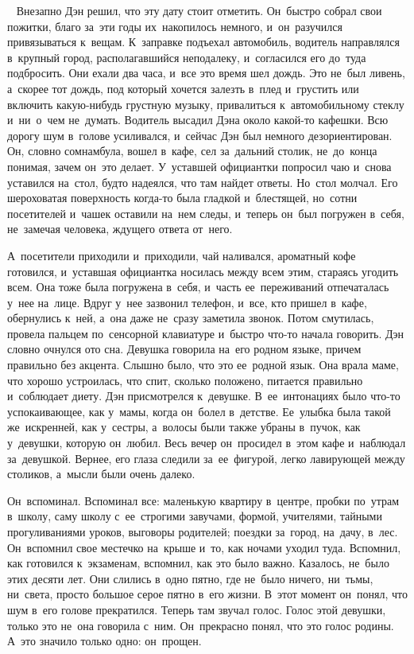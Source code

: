 ~
Внезапно Дэн решил, что эту дату стоит отметить.
Он~быстро собрал свои пожитки, благо за~эти годы их~накопилось немного, и~он~разучился привязываться к~вещам.
К~заправке подъехал автомобиль, водитель направлялся в~крупный город, располагавшийся неподалеку, и~согласился его до~туда подбросить.
Они ехали два часа, и~все это время шел дождь.
Это не~был ливень, а~скорее тот дождь, под который хочется залезть в~плед и~грустить или включить какую-нибудь грустную музыку, привалиться к~автомобильному стеклу и~ни~о~чем не~думать.
Водитель высадил Дэна около какой-то кафешки.
Всю дорогу шум в~голове усиливался, и~сейчас Дэн был немного дезориентирован.
Он, словно сомнамбула, вошел в~кафе, сел за~дальний столик, не~до~конца понимая, зачем он~это делает.
У~уставшей официантки попросил чаю и~снова уставился на~стол, будто надеялся, что там найдет ответы.
Но~стол молчал.
Его шероховатая поверхность когда-то была гладкой и~блестящей, но~сотни посетителей и~чашек оставили на~нем следы, и~теперь он~был погружен в~себя, не~замечая человека, ждущего ответа от~него.
 
А~посетители приходили и~приходили, чай наливался, ароматный кофе готовился, и~уставшая официантка носилась между всем этим, стараясь угодить всем.
Она тоже была погружена в~себя, и~часть ее~переживаний отпечаталась у~нее на~лице.
Вдруг у~нее зазвонил телефон, и~все, кто пришел в~кафе, обернулись к~ней, а~она даже не~сразу заметила звонок.
Потом смутилась, провела пальцем по~сенсорной клавиатуре и~быстро что-то начала говорить.
Дэн словно очнулся ото сна.
Девушка говорила на~его родном языке, причем правильно без акцента.
Слышно было, что это ее~родной язык.
Она врала маме, что хорошо устроилась, что спит, сколько положено, питается правильно и~соблюдает диету.
Дэн присмотрелся к~девушке.
В~ее~интонациях было что-то успокаивающее, как у~мамы, когда он~болел в~детстве.
Ее~улыбка была такой же~искренней, как у~сестры, а~волосы были также убраны в~пучок, как у~девушки, которую он~любил.
Весь вечер он~просидел в~этом кафе и~наблюдал за~девушкой.
Вернее, его глаза следили за~ее~фигурой, легко лавирующей между столиков, а~мысли были очень далеко.
 
Он~вспоминал.
Вспоминал все: маленькую квартиру в~центре, пробки по~утрам в~школу, саму школу с~ее~строгими завучами, формой, учителями, тайными прогуливаниями уроков, выговоры родителей; поездки за~город, на~дачу, в~лес.
Он~вспомнил свое местечко на~крыше и~то, как ночами уходил туда.
Вспомнил, как готовился к~экзаменам, вспомнил, как это было важно.
Казалось, не~было этих десяти лет.
Они слились в~одно пятно, где не~было ничего, ни~тьмы, ни~света, просто большое серое пятно в~его жизни.
В~этот момент он~понял, что шум в~его голове прекратился.
Теперь там звучал голос.
Голос этой девушки, только это не~она говорила с~ним.
Он~прекрасно понял, что это голос родины.
А~это значило только одно: он~прощен.
 
